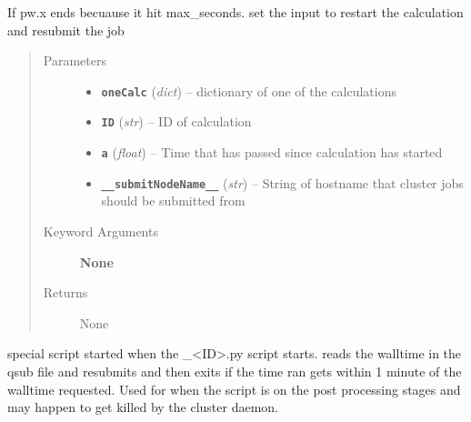 \documentclass[letterpaper,10pt,english]{sphinxmanual}
\begin{document}
\begin{fulllineitems}
\label{run:run.__restartPW}
If pw.x ends becuause it hit max\_seconds. set the input to restart the calculation
and resubmit the job
\begin{quote}\begin{description}
\item[{Parameters}] \leavevmode\begin{itemize}
\item {} 
\textbf{\texttt{oneCalc}} (\emph{dict}) -- dictionary of one of the calculations

\item {} 
\textbf{\texttt{ID}} (\emph{str}) -- ID of calculation

\item {} 
\textbf{\texttt{a}} (\emph{float}) -- Time that has passed since calculation has started

\item {} 
\textbf{\texttt{\_\_submitNodeName\_\_}} (\emph{str}) -- String of hostname that cluster jobs should be submitted from

\end{itemize}

\item[{Keyword Arguments}] \leavevmode
\textbf{None}

\item[{Returns}] \leavevmode
None

\end{description}\end{quote}

\end{fulllineitems}


\begin{fulllineitems}
\label{run:run.__restartScript}
special script started when the \_\textless{}ID\textgreater{}.py script starts. reads the walltime in the qsub file and
resubmits and then exits if the time ran gets within 1 minute of the walltime requested.
Used for when the script is on the post processing stages and may happen to get killed by
the cluster daemon.

\end{fulllineitems}
\end{document}
